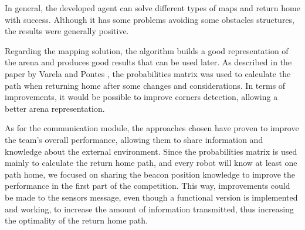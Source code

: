 \documentclass[oribibl]{llncs}
\begin{document}
In general, the developed agent can solve different types of maps and return home with success. Although it has some problems avoiding some obstacles structures, the results were generally positive.

Regarding the mapping solution, the algorithm builds a good representation of the arena and produces good results that can be used later. As described in the paper by Varela and Pontes \cite{varelaepontes}, the probabilities matrix was used to calculate the path when returning home after some changes and considerations. In terms of improvements, it would be possible to improve corners detection, allowing a better arena representation.

As for the communication module, the approaches chosen have proven to improve the team's overall performance, allowing them to share information and knowledge about the external environment. Since the probabilities matrix is used mainly to calculate the return home path, and every robot will know at least one path home, we focused on sharing the beacon position knowledge to improve the performance in the first part of the competition. This way, improvements could be made to the sensors message, even though a functional version is implemented and working, to increase the amount of information transmitted, thus increasing the optimality of the return home path.




\end{document}
